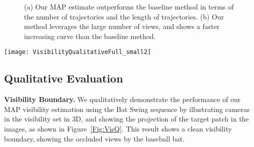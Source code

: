 \documentclass[10pt,twocolumn,letterpaper]{article}
\begin{document}
\begin{figure}[t]
  \centering       
 \caption{(a) Our MAP estimate outperforms the baseline method in terms of the number of trajectories and the length of trajectories. (b) Our method leverages the large number of views, and shows a faster increasing curve than the baseline method.} 
  \label{Fig:quantitative}
\end{figure}

\begin{figure*}[th]
  \centering       
  \texttt{[image: VisibilityQualitativeFull\_small2]}
   \caption{We qualitatively demonstrate the performance of MAP visibility estimation using the Bat Swing sequence. The normal of the selected patch is shown as a red arrow in the 3D view (left) and projected patch is shown as a red polygon in each image (right). The images with a blue boundary are the views that belongs to the visibility set. The bat occludes the patch and its effect can be seen as a ``shadow" on the visibility set of cameras (left).}
  \label{Fig:VisQ}
\end{figure*}


\subsection{Qualitative Evaluation}
\noindent \textbf{Visibility Boundary.} We qualitatively demonstrate the performance of our MAP visibility estimation using the Bat Swing sequence by illustrating cameras in the visibility set in 3D, and showing the projection of the target patch in the images, as shown in Figure~\ref{Fig:VisQ}. This result shows a clean visibility boundary, showing the occluded views by the baseball bat.  
\end{document}
